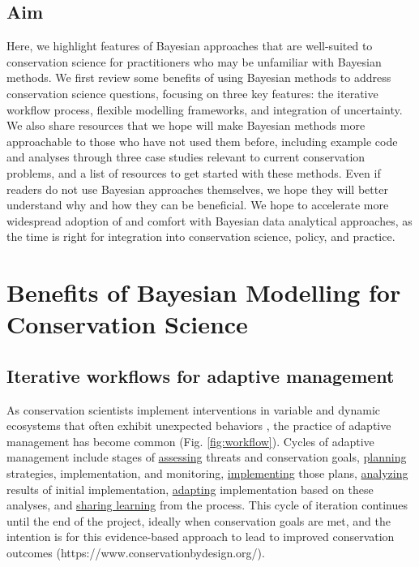 \documentclass{article}
\begin{document}
\subsection*{Aim} Here,  we highlight features of Bayesian approaches that are well-suited to conservation science for practitioners who may be unfamiliar with Bayesian methods. We first review some benefits of using Bayesian methods to address conservation science questions, focusing on three key features: the iterative workflow process, flexible modelling frameworks, and integration of uncertainty. We also share resources that we hope will make Bayesian methods more approachable to those who have not used them before, including example code and analyses through three case studies relevant to current conservation problems, and a list of resources to get started with these methods. Even if readers do not use Bayesian approaches themselves, we hope they will better understand why and how they can be beneficial. We hope to accelerate more widespread adoption of and comfort with Bayesian data analytical approaches, as the time is right for integration into conservation science, policy, and practice. 

\section* {Benefits of Bayesian Modelling for Conservation Science}
\subsection*{Iterative workflows for adaptive management}
\par As conservation scientists implement interventions in variable and dynamic ecosystems that often exhibit unexpected behaviors \citep{Levin2012,Gross2013}, the practice of adaptive management has become common \citep{holling1978adaptive} (Fig. \ref{fig:workflow}). Cycles of adaptive management include stages of \underline{assessing} threats and conservation goals, \underline{planning} strategies, implementation, and monitoring, \underline{implementing} those plans, \underline{analyzing} results of initial implementation, \underline{adapting} implementation based on these analyses, and \underline{sharing learning} from the process. This cycle of iteration continues until the end of the project, ideally when conservation goals are met, and the intention is for this evidence-based approach to lead to improved conservation outcomes (https://www.conservationbydesign.org/).
\end{document}
